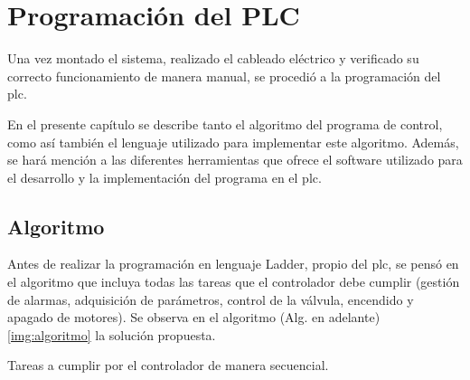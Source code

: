 \chapter{Programación del PLC}
\label{ch:progPLC}

Una vez montado el sistema, realizado el cableado eléctrico y verificado su
correcto funcionamiento de
manera manual, se procedió a la programación del \gls{plc}.

En el presente capítulo se describe tanto el algoritmo del programa de control,
como así también el lenguaje utilizado para implementar este algoritmo.
Además, se hará mención a las diferentes herramientas que ofrece el software
utilizado para el desarrollo y la implementación del programa en el \gls{plc}.

\section{Algoritmo}
\label{sec:Algoritmo}
Antes de realizar la programación en lenguaje Ladder, propio del \gls{plc},
se pensó en el algoritmo que incluya todas las tareas que el
controlador debe cumplir (gestión de alarmas, adquisición de parámetros,
control de la válvula, encendido y apagado de motores).
Se observa en el algoritmo (Alg. en adelante) \ref{img:algoritmo} la
solución propuesta.

\begin{algorithm}[!ht]
 \small
 \caption{Tareas a cumplir por el controlador de manera secuencial.}
 \label{img:algoritmo}
\end{algorithm}

